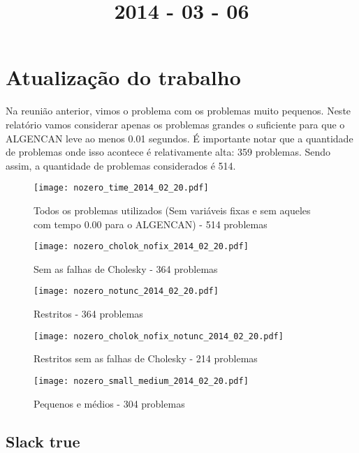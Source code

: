 \documentclass{article}
\title{2014 - 03 - 06}
\author{}
\date{}
\begin{document}
\maketitle
\section{Atualização do trabalho}

Na reunião anterior, vimos o problema com os problemas muito pequenos. Neste
relatório vamos considerar apenas os problemas grandes o suficiente para que o
ALGENCAN leve ao menos 0.01 segundos.
É importante notar que a quantidade de problemas onde isso acontece é
relativamente alta: 359 problemas.
Sendo assim, a quantidade de problemas considerados é 514.

\begin{figure}[H]
  \centering
  \texttt{[image: nozero\_time\_2014\_02\_20.pdf]}
  \caption{Todos os problemas utilizados (Sem variáveis fixas e sem aqueles
  com tempo 0.00 para o ALGENCAN) - 514 problemas}
  \label{fig:nozero_time}
\end{figure}
\begin{figure}[H]
  \centering
  \texttt{[image: nozero\_cholok\_nofix\_2014\_02\_20.pdf]}
  \caption{Sem as falhas de Cholesky - 364 problemas}
\end{figure}
\begin{figure}[H]
  \centering
  \texttt{[image: nozero\_notunc\_2014\_02\_20.pdf]}
  \caption{Restritos - 364 problemas}
\end{figure}
\begin{figure}[H]
  \centering
  \texttt{[image: nozero\_cholok\_nofix\_notunc\_2014\_02\_20.pdf]}
  \caption{Restritos sem as falhas de Cholesky - 214 problemas}
\end{figure}
\begin{figure}[H]
  \centering
  \texttt{[image: nozero\_small\_medium\_2014\_02\_20.pdf]}
  \caption{Pequenos e médios - 304 problemas}
\end{figure}

\newpage
\subsection{Slack true}
\end{document}
